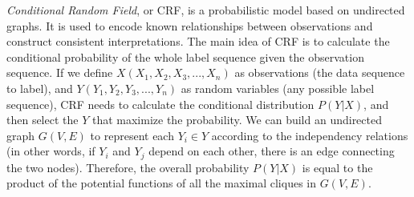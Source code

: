 {%
%
%


%

\emph{Conditional Random Field}, or CRF\cite{CRFLafferty},
is a probabilistic model based on undirected graphs.
It is used to encode known relationships between observations and construct consistent interpretations.
The main idea of CRF is to calculate the conditional probability
of the whole label sequence given the observation sequence.
If we define $X(X_{1},X_{2},X_{3},...,X_{n})$ as observations
(the data sequence to label), and $Y(Y_{1},Y_{2},Y_{3},...,Y_{n})$
as random variables (any possible label sequence),
CRF needs to calculate the conditional distribution $P(Y|X)$,
and then select the $Y$ that maximize the probability.
We can build an undirected graph $G(V,E)$ to represent each $Y_{i} \in Y$
according to the independency relations
(in other words, if $Y_{i}$ and $Y_{j}$ depend on each other,
there is an edge connecting the two nodes).
Therefore, the overall probability $P(Y|X)$ is equal to
the product of the potential functions of all the maximal cliques in $G(V,E)$.

}
